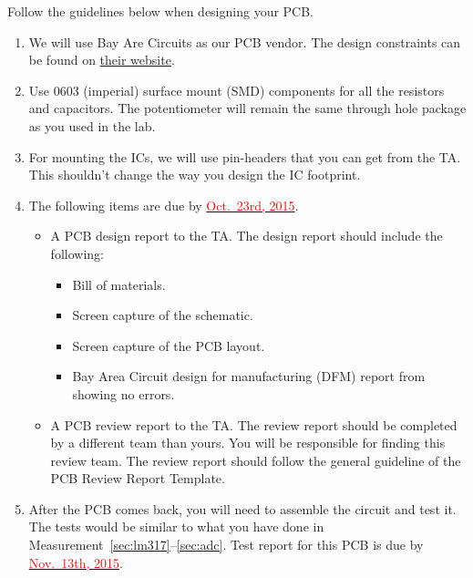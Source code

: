 \documentclass[letterpaper, 11pt]{article}
\newcommand{\due}[1]{\href{https://github.com/ucdart/UCD-EEC134/blob/master/support/schedule/eec134-schedule.pdf}{\textcolor{red}{#1}}}
\begin{document}
Follow the guidelines below when designing your PCB. 
\begin{enumerate}
	\item We will use Bay Are Circuits as our PCB vendor. The design constraints can be found on \href{http://store.bayareacircuits.com/student-special/}{their website}. 
	
	\item Use 0603 (imperial) surface mount (SMD) components for all the resistors and capacitors. The potentiometer will remain the same through hole package as you used in the lab. 
	
	\item For mounting the ICs, we will use pin-headers that you can get from the TA. This shouldn't change the way you design the IC footprint. 

	\item The following items are due by \due{Oct.~23rd, 2015}. 
		\begin{itemize}
			\item A PCB design report to the TA. The design report should include the following:
				\begin{itemize}
					\item Bill of materials.
					\item Screen capture of the schematic.
					\item Screen capture of the PCB layout.
					\item Bay Area Circuit design for manufacturing (DFM) report from showing no errors.
				\end{itemize}
			\item A PCB review report to the TA. The review report should be completed by a different team than yours. You will be responsible for finding this review team. The review report should follow the general guideline of the PCB Review Report Template.
		\end{itemize}

	\item After the PCB comes back, you will need to assemble the circuit and test it. The tests would be similar to what you have done in Measurement~\ref{sec:lm317}--\ref{sec:adc}. Test report for this PCB is due by \due{Nov.~13th, 2015}.
\end{enumerate}


%
%
\end{document}

